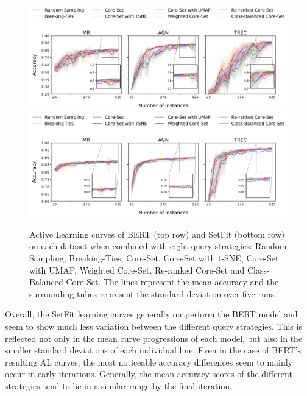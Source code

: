 \documentclass[english,bachelor,ul]{webisthesis} %
\begin{document}
\begin{figure}[htbp]
    \centering
    \includegraphics[width=1\textwidth,trim={0 1.1cm 0 0},clip]{img/bert-plots-1.png}
    \includegraphics[width=1\textwidth,trim={0 0 0 4.83cm},clip]{img/setfit-plots-1.png}
    \caption{Active Learning curves of BERT (top row) and SetFit (bottom row) on each dataset when combined with eight query strategies: Random Sampling, Breaking-Ties, Core-Set, Core-Set with t-SNE, Core-Set with UMAP, Weighted Core-Set, Re-ranked Core-Set and Class-Balanced Core-Set. The lines represent the mean accuracy and the surrounding tubes represent the standard deviation over five runs.}
    \label{fig:learning-curves}
\end{figure}

Overall, the SetFit learning curves generally outperform the BERT model and seem to show much less variation between the different query strategies. This is reflected not only in the mean curve progressions of each model, but also in the smaller standard deviations of each individual line. Even in the case of BERT's resulting AL curves, the most noticeable accuracy differences seem to mainly occur in early iterations. Generally, the mean accuracy scores of the different strategies tend to lie in a similar range by the final iteration. 
\end{document}
